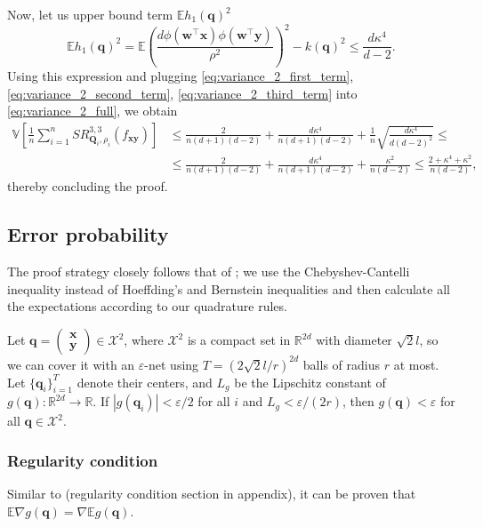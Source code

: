 Now, let us upper bound term $\mathbb{E}h_1(\mathbf{q})^2$
\[
\mathbb{E}h_1(\mathbf{q})^2 =
\mathbb{E}\left ( \frac{d \phi(\mathbf{w}^{\boldsymbol{\top}}\mathbf{x}) \phi(\mathbf{w}^{\boldsymbol{\top}}\mathbf{y})}{\rho^2} \right )^2
- k(\mathbf{q})^2 \le \frac{d \kappa^4}{d - 2}.
\]
Using this expression and plugging \eqref{eq:variance_2_first_term}, \eqref{eq:variance_2_second_term}, \eqref{eq:variance_2_third_term}
into \eqref{eq:variance_2_full}, we obtain
\begin{align}
\label{eq:variance_2_upper_bound}
\mathbb{V} \left [
\frac{1}{n}\sum_{i = 1}^nSR^{3, 3}_{\mathbf{Q}_i,\rho_i}(f_{\mathbf{xy}})
\right ] &\le \frac{2}{n(d + 1)(d - 2)} + \frac{d\kappa^4}{n(d + 1)(d - 2)} +
\frac{1}{n}\sqrt{\frac{d\kappa^4}{d(d - 2)^2}} \le \nonumber \\
&\le \frac{2}{n(d + 1)(d - 2)} + \frac{d\kappa^4}{n(d + 1)(d - 2)} +
\frac{\kappa^2}{n(d - 2)} \le \frac{2 + \kappa^4 + \kappa^2}{n(d - 2)},
\end{align}
thereby concluding the proof.

\subsection{Error probability}
The proof strategy closely follows that of \citep{sutherland2015error}; we use the Chebyshev-Cantelli inequality
instead of Hoeffding's and Bernstein inequalities and then calculate all the expectations according to our quadrature rules.

Let $\mathbf{q} = \begin{pmatrix} \mathbf{x} \\ \mathbf{y} \end{pmatrix} \in \mathcal{X}^2$,
where $\mathcal{X}^2$ is a compact set in $\mathbb{R}^{2d}$ with diameter $\sqrt{2}l$, so we can cover it with an
$\varepsilon$-net using $T = (2\sqrt{2}l/r)^{2d}$ balls of radius $r$ at most.
Let $\{\mathbf{q}_i\}_{i=1}^T$ denote their centers, and $L_g$ be the Lipschitz constant of $g(\mathbf{q}): \mathbb{R}^{2d} \rightarrow \mathbb{R}$.
If $|g(\mathbf{q}_i)| < \varepsilon / 2$ for all $i$ and $L_g < \varepsilon / (2r)$, then $g(\mathbf{q}) < \varepsilon$ for all
$\mathbf{q} \in \mathcal{X}^2$.

\subsubsection{Regularity condition}
Similar to \citep{sutherland2015error} (regularity condition section in appendix), it can be proven
that $\mathbb{E}\nabla g(\mathbf{q}) = \nabla \mathbb{E}g(\mathbf{q})$.

